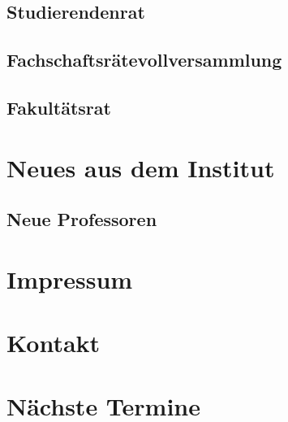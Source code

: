 \documentclass{fsinewsletter}
\begin{document}

\subsection{Studierendenrat}

\subsection{Fachschaftsrätevollversammlung}

\subsection{Fakultätsrat}

\newpage
\section{Neues aus dem Institut}

\subsection{Neue Professoren}

\newpage
\section{Impressum}


\section{Kontakt}

\section{Nächste Termine}

\end{document}
